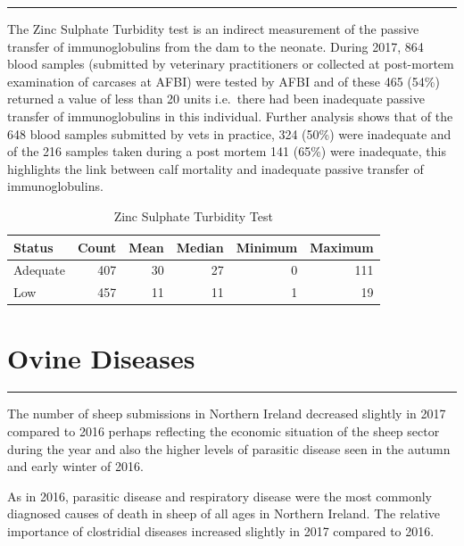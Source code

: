 \documentclass[]{book}
\begin{document}
\begin{center}\rule{0.5\linewidth}{\linethickness}\end{center}

The Zinc Sulphate Turbidity test is an indirect measurement of the
passive transfer of immunoglobulins from the dam to the neonate. During
2017, 864 blood samples (submitted by veterinary practitioners or
collected at post-mortem examination of carcases at AFBI) were tested by
AFBI and of these 465 (54\%) returned a value of less than 20 units
i.e.~there had been inadequate passive transfer of immunoglobulins in
this individual. Further analysis shows that of the 648 blood samples
submitted by vets in practice, 324 (50\%) were inadequate and of the 216
samples taken during a post mortem 141 (65\%) were inadequate, this
highlights the link between calf mortality and inadequate passive
transfer of immunoglobulins.

\begin{table}

\caption{\label{tab:unnamed-chunk-72}Zinc Sulphate Turbidity Test}
\centering
\begin{tabular}[t]{l|r|r|r|r|r}
\hline
Status & Count & Mean & Median & Minimum & Maximum\\
\hline
Adequate & 407 & 30 & 27 & 0 & 111\\
\hline
Low & 457 & 11 & 11 & 1 & 19\\
\hline
\end{tabular}
\end{table}

\chapter{Ovine Diseases}\label{ovine-diseases}

\begin{center}\rule{0.5\linewidth}{\linethickness}\end{center}

The number of sheep submissions in Northern Ireland decreased slightly
in 2017 compared to 2016 perhaps reflecting the economic situation of
the sheep sector during the year and also the higher levels of parasitic
disease seen in the autumn and early winter of 2016.

As in 2016, parasitic disease and respiratory disease were the most
commonly diagnosed causes of death in sheep of all ages in Northern
Ireland. The relative importance of clostridial diseases increased
slightly in 2017 compared to 2016.
\end{document}
